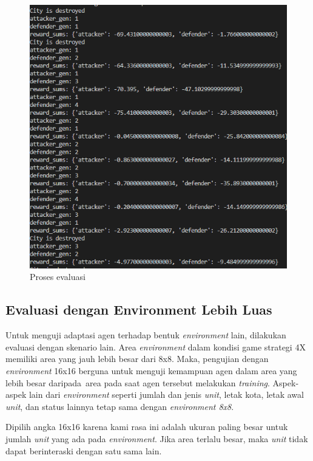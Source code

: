\begin{figure}[H]
  \centering
    \includegraphics[scale=1.05]{gambar/evaluation_inference.png}
    \caption{Proses evaluasi}
    \label{fig:evaluationProcess}
\end{figure}

\subsection{Evaluasi dengan Environment Lebih Luas}
Untuk menguji adaptasi agen terhadap bentuk \emph{environment} lain, dilakukan evaluasi dengan skenario lain. 
Area \emph{environment} dalam kondisi game strategi 4X memiliki area yang jauh lebih besar dari 8x8.
Maka, pengujian dengan \emph{environment} 16x16 berguna untuk menguji kemampuan agen dalam area yang lebih besar daripada\
area pada saat agen tersebut melakukan \emph{training}.
Aspek-aspek lain dari \emph{environment} seperti jumlah dan jenis \emph{unit}, letak kota, letak awal \emph{unit}, dan status lainnya tetap sama dengan \emph{environment 8x8}.

Dipilih angka 16x16 karena kami rasa ini adalah ukuran paling besar untuk jumlah \emph{unit} yang ada pada \emph{environment}.
Jika area terlalu besar, maka \emph{unit} tidak dapat berinteraski dengan satu sama lain.

